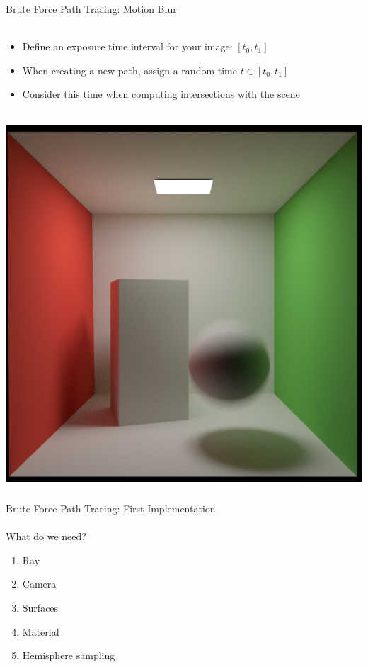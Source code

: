 \documentclass[utf8,stillsansserifmath,fleqn,t]{beamer}
\begin{document}
\begin{frame}
\frametitle{\insertsection}
Brute Force Path Tracing: Motion Blur\\
~\\
\begin{minipage}[t]{0.49\textwidth}
\begin{itemize}
\item Define an exposure time interval for your image: $[t_0, t_1]$
\item When creating a new path, assign a random time $t\in [t_0,t_1]$
\item Consider this time when computing intersections with the scene
\end{itemize}
\end{minipage}\hfill
\begin{minipage}[t]{0.49\textwidth}
~\\[-\baselineskip]
\includegraphics[width=\textwidth]{./fig/cornellbox-motionblur.png}
\end{minipage}
\end{frame}

\begin{frame}[label=path-tracing-brute-force-implementation]
\frametitle{\insertsection}
Brute Force Path Tracing: First Implementation\\~\\
What do we need?
\begin{enumerate}
\item Ray
\item Camera
\item Surfaces
\item Material
\item Hemisphere sampling
\end{enumerate}
\end{frame}
\end{document}
